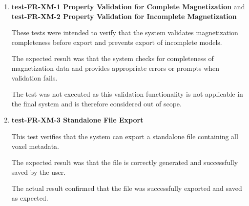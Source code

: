 \documentclass[12pt, titlepage]{article}
\begin{document}
\begin{enumerate}

\item \textbf{test-FR-XM-1 Property Validation for Complete Magnetization} and \textbf{test-FR-XM-2 Property Validation for Incomplete Magnetization}

\hspace{1.5em} These tests were intended to verify that the system validates magnetization completeness before export and prevents export of incomplete models.

The expected result was that the system checks for completeness of magnetization data and provides appropriate errors or prompts when validation fails.

The test was not executed as this validation functionality is not applicable in the final system and is therefore considered out of scope.


\item \textbf{test-FR-XM-3 Standalone File Export}

\hspace{1.5em} This test verifies that the system can export a standalone file containing all voxel metadata.

The expected result was that the file is correctly generated and successfully saved by the user.

The actual result confirmed that the file was successfully exported and saved as expected.



\end{enumerate}
\end{document}
